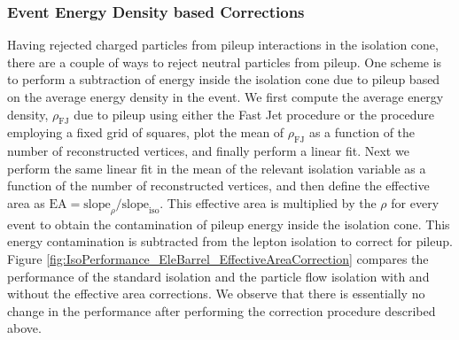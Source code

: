 \subsubsection{Event Energy Density based Corrections}
\label{sec:CorrectionBasedIsolation}

Having rejected charged particles from pileup interactions in the isolation cone, there are
a couple of ways to reject neutral particles from pileup. One scheme is to perform a 
subtraction of energy inside the isolation cone due to pileup based on the average energy
density in the event. We first compute the average energy density, $\rho_{\mathrm{FJ}}$ due to 
pileup using either the Fast Jet procedure or the procedure employing a fixed grid of squares, 
plot the mean of $\rho_{\mathrm{FJ}}$ as a function of
the number of reconstructed vertices, and finally perform a linear fit. Next we perform the 
same linear fit in the mean of the relevant isolation variable as a function of the number of 
reconstructed vertices, and then define the effective area as 
$\mathrm{EA} = \mathrm{slope}_{\rho} / \mathrm{slope}_{\mathrm{iso}}$. This effective area 
is multiplied by the $\rho$ for every event to obtain the contamination of pileup energy
inside the isolation cone. This energy contamination is subtracted from the lepton isolation
to correct for pileup. Figure \ref{fig:IsoPerformance_EleBarrel_EffectiveAreaCorrection}
compares the performance of the standard isolation and the particle flow isolation with and
without the effective area corrections. We observe that there is essentially no change
in the performance after performing the correction procedure described above.


